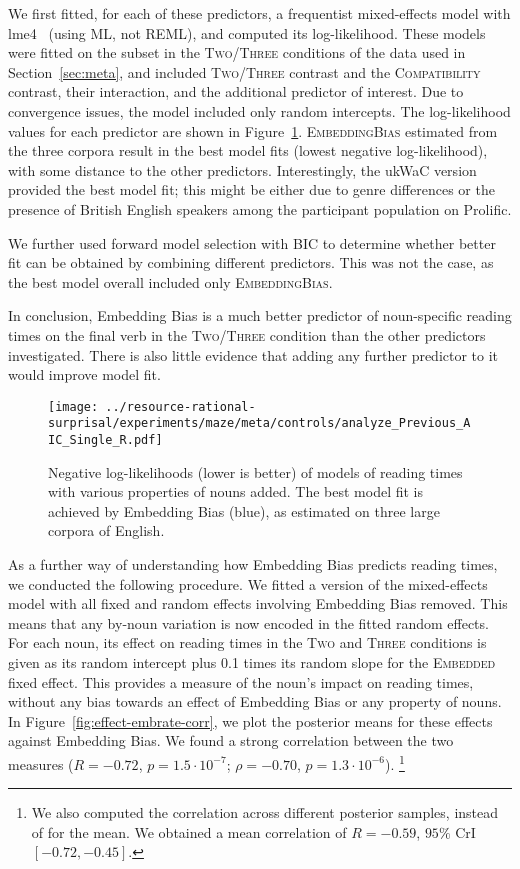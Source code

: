 We first fitted, for each of these predictors, a frequentist mixed-effects model with lme4~\citep{Bates2014FittingLM} (using ML, not REML), and computed its log-likelihood. 
These models were fitted on the subset in the \textsc{Two}/\textsc{Three} conditions of the data used in Section~\ref{sec:meta}, and included \textsc{Two}/\textsc{Three} contrast and the \textsc{Compatibility} contrast, their interaction, and the additional predictor of interest.
Due to convergence issues, the model included only random intercepts.
The log-likelihood values for each predictor are shown in Figure~\ref{fig:predictors-aic}.
\textsc{EmbeddingBias} estimated from the three corpora result in the best model fits (lowest negative log-likelihood), with some distance to the other predictors.
Interestingly, the ukWaC version provided the best model fit; this might be either due to genre differences or the presence of British English speakers among the participant population on Prolific.

We further used forward model selection with BIC to determine whether better fit can be obtained by combining different predictors.
This was not the case, as the best model overall included only \textsc{EmbeddingBias}. 

In conclusion, Embedding Bias is a much better predictor of noun-specific reading times on the final verb in the \textsc{Two}/\textsc{Three} condition than the other predictors investigated.
There is also little evidence that adding any further predictor to it would improve model fit.

\begin{figure}
	\centering
    \texttt{[image: ../resource-rational-surprisal/experiments/maze/meta/controls/analyze\_Previous\_AIC\_Single\_R.pdf]}


	\caption{Negative log-likelihoods (lower is better) of models of reading times with various properties of nouns added. The best model fit is achieved by Embedding Bias (blue), as estimated on three large corpora of English.}\label{fig:predictors-aic}
\end{figure}


As a further way of understanding how Embedding Bias predicts reading times, we conducted the following procedure.
We fitted a version of the mixed-effects model with all fixed and random effects involving Embedding Bias removed.
This means that any by-noun variation is now encoded in the fitted random effects.
For each noun, its effect on reading times in the \textsc{Two} and \textsc{Three} conditions is given as its random intercept plus 0.1 times its random slope for the \textsc{Embedded} fixed effect.
This provides a measure of the noun's impact on reading times, without any bias towards an effect of Embedding Bias or any property of nouns.
In Figure~\ref{fig:effect-embrate-corr}, we plot the posterior means for these effects against Embedding Bias. 
We found a strong correlation between the two measures ($R = -0.72$, $p=1.5\cdot 10^{-7}$; $\rho = -0.70$, $p=1.3 \cdot 10^{-6}$).
\footnote{We also computed the correlation across different posterior samples, instead of for the mean. We obtained a mean correlation of $R=-0.59$, $95\%$ CrI $[-0.72, -0.45]$.}



